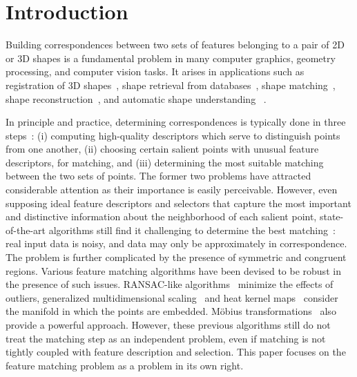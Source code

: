 \section{Introduction}
\label{sec:introduction}

Building correspondences between two sets of features belonging to a pair of 2D or 3D shapes
is a fundamental problem in many computer graphics, geometry processing, and computer vision tasks.
It arises in applications such as
registration of 3D shapes~\cite{Besl92,Gelfand05,Aiger08,li08,Chang09,Zeng10,vanKaick11,Chang11},
shape retrieval from databases~\cite{Bronstein11},
shape matching~\cite{Berg05,Brown07,Lorenzo08,Tevs09,Ovsjanikov10,Tevs11,SahilliogluY11,Windheuser11},
shape reconstruction~\cite{Brown07,Pekelny08,Wand09,Chang11},
and automatic shape understanding~\cite{Lipman09,Sun10,Kim11} .

In principle and practice, determining correspondences is typically done in three steps~\cite{Johnson99,Lowe04,Sun09,Bokeloh08,Toler10,Leutenegger11}:
(i) computing high-quality descriptors which serve to distinguish points from one another,
(ii) choosing certain salient points with unusual feature descriptors, for matching,
and (iii) determining the most suitable matching between the two sets of points.
The former two problems have attracted considerable attention as their importance is easily perceivable.
However, even supposing ideal feature descriptors and selectors that capture the most important and distinctive information about the neighborhood of each salient point,
state-of-the-art algorithms  still find it challenging to determine the best matching~\cite{vanKaick11}:  real input data is noisy, and data may only be approximately in correspondence. The problem is further complicated by the presence of symmetric and congruent regions.
Various feature matching algorithms have been devised to be robust in the presence of such issues. RANSAC-like algorithms~\cite{Tevs09,Tevs11}  minimize the effects of outliers,
generalized multidimensional scaling~\cite{Bronstein11} and
heat kernel maps~\cite{Ovsjanikov10}  consider the manifold in which the points are embedded. M{\"o}bius transformations~\cite{Lipman09,Kim11} also provide a powerful approach.
However, these previous algorithms still do not treat the matching step as an independent problem, even if matching is not tightly coupled with feature description and selection.
This paper focuses on the feature matching problem as a problem in its own right.

